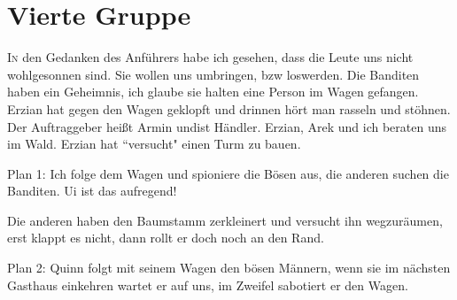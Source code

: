 \chapter{Vierte Gruppe}
\lettrine{I}{n} den Gedanken des Anführers habe ich gesehen, dass die Leute uns nicht wohlgesonnen sind. Sie wollen uns umbringen, bzw loswerden. 
Die Banditen haben ein Geheimnis, ich glaube sie halten eine Person im Wagen gefangen.
Erzian hat gegen den Wagen geklopft und drinnen hört man rasseln und stöhnen. Der Auftraggeber heißt Armin undist Händler.
Erzian, Arek und ich beraten uns im Wald.
Erzian hat ``versucht" einen Turm zu bauen.

Plan 1: Ich folge dem Wagen und spioniere die Bösen aus, die anderen suchen die Banditen. Ui ist das aufregend!

Die anderen haben den Baumstamm zerkleinert und versucht ihn wegzuräumen, erst klappt es nicht, dann rollt er doch noch an den Rand.

Plan 2: Quinn folgt mit seinem Wagen den bösen Männern, wenn sie im nächsten Gasthaus einkehren wartet er auf uns, im Zweifel sabotiert er den Wagen.